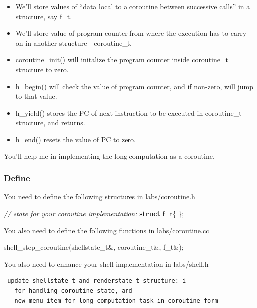 \documentclass[]{book}
\newenvironment{Shaded}{}{}
\newcommand{\KeywordTok}[1]{\textbf{{#1}}}
\newcommand{\CommentTok}[1]{\textcolor[rgb]{0.50,0.50,0.50}{\textit{{#1}}}}
\newcommand{\NormalTok}[1]{{#1}}
\begin{document}
\begin{itemize}
\itemsep1pt\parskip0pt
\item
  We'll store values of ``data local to a coroutine between successive
  calls'' in a structure, say f\_t.
\item
  We'll store value of program counter from where the execution has to
  carry on in another structure - coroutine\_t.
\item
  coroutine\_init() will initalize the program counter inside
  coroutine\_t structure to zero.
\item
  h\_begin() will check the value of program counter, and if non-zero,
  will jump to that value.
\item
  h\_yield() stores the PC of next instruction to be executed in
  coroutine\_t structure, and returns.
\item
  h\_end() resets the value of PC to zero.
\end{itemize}

You'll help me in implementing the long computation as a coroutine.

\subsubsection*{Define}\label{define-4}

You need to define the following structures in labs/coroutine.h

\begin{Shaded}
\begin{Highlighting}[]
   \CommentTok{// state for your coroutine implementation:}
   \KeywordTok{struct} \NormalTok{f_t\{}
   \NormalTok{\};}
\end{Highlighting}
\end{Shaded}

You also need to define the following functions in labs/coroutine.cc

\begin{Shaded}
\begin{Highlighting}[]
   \NormalTok{shell_step_coroutine(shellstate_t&, coroutine_t&, f_t&);}
\end{Highlighting}
\end{Shaded}

You also need to enhance your shell implementation in labs/shell.h

\begin{verbatim}
 update shellstate_t and renderstate_t structure: i
   for handling coroutine state, and
   new menu item for long computation task in coroutine form
\end{verbatim}
\end{document}
